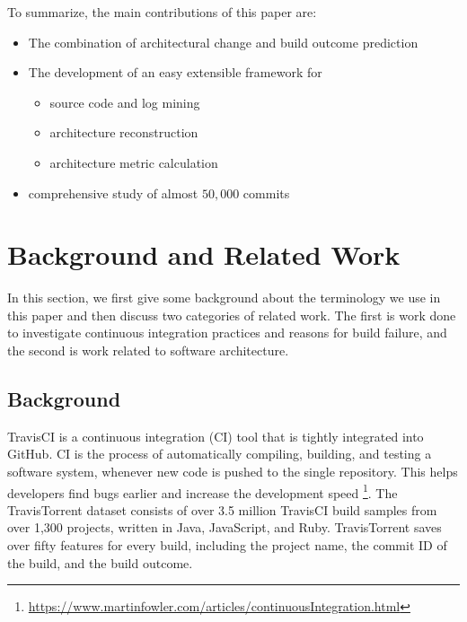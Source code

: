\documentclass[sigplan, anonymous, review]{acmart}
\begin{document}
To summarize, the main contributions of this paper are:
\begin{itemize}
\item The combination of architectural change and build outcome prediction
\item The development of an easy extensible framework for 
\begin{itemize}
	\item source code and log mining
	\item architecture reconstruction
	\item architecture metric calculation
\end{itemize}
\item comprehensive study of almost $50,000$ commits
\end{itemize}


\section{Background and Related Work}

In this section, we first give some background about the terminology we use in this paper and then discuss two categories of related work. The first is work done to investigate continuous integration practices and reasons for build failure, and the second is work related to software architecture.

\subsection{Background}
TravisCI is a continuous integration (CI) tool that is tightly integrated into GitHub. CI is the process of automatically compiling, building, and testing a software system, whenever new code is pushed to the single repository. This helps developers find bugs earlier and increase the development speed \footnote{\url{https://www.martinfowler.com/articles/continuousIntegration.html}}. 
The TravisTorrent dataset \cite{TravisTorrent} consists of over 3.5 million TravisCI build samples from over 1,300 projects, written in Java, JavaScript, and Ruby.
TravisTorrent saves over fifty features for every build, including the project name, the commit ID of the build, and the build outcome.
\end{document}
